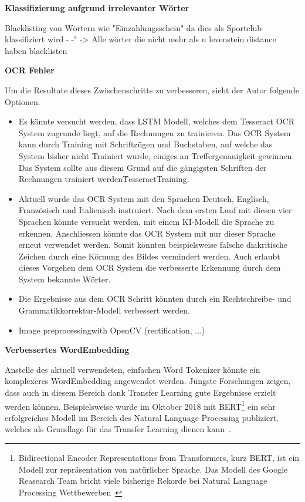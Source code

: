 \textbf{Klassifizierung aufgrund irrelevanter Wörter}

Blacklisting von Wörtern wie "Einzahlungsschein" da dies als Sportclub klassifiziert wird -.-" -> Alle wörter die nicht mehr als n levenstein distance haben blacklisten

\textbf{OCR Fehler}

Um die Resultate dieses Zwischenschritts zu verbesseren, sieht der Autor folgende Optionen.

\begin{itemize}
    \item Es könnte versucht werden, dass LSTM Modell, welches dem Tesseract OCR System zugrunde liegt, auf die Rechnungen zu trainieren. Das OCR System kann durch Training mit Schriftzügen und Buchstaben, auf welche das System bisher nicht Trainiert wurde, einiges an Treffergenauigkeit gewinnen. Das System sollte aus diesem Grund auf die gängigsten Schriften der Rechnungen trainiert werden\~{TesseractTraining}.
    \item Aktuell wurde das OCR System mit den Sprachen Deutsch, Englisch, Französisch und Italienisch instruiert. Nach dem ersten Lauf mit diesen vier Sprachen könnte versucht werden, mit einem KI-Modell die Sprache zu erkennen. Anschliessen könnte das OCR System mit nur dieser Sprache erneut verwendet werden. Somit könnten beispielsweise falsche diakritische Zeichen durch eine Körnung des Bildes vermindert werden. Auch erlaubt dieses Vorgehen dem OCR System die verbesserte Erkennung durch dem System bekannte Wörter.
    \item Die Ergebnisse aus dem OCR Schritt könnten durch ein Rechtschreibe- und Grammatikkorrektur-Modell verbessert werden. 
    \item Image preprocessingwith OpenCV (rectification, ...)
\end{itemize}

\textbf{Verbessertes WordEmbedding}

Anstelle des aktuell verwendeten, einfachen Word Tokenizer könnte ein komplexeres WordEmbedding angewendet werden. Jüngste Forschungen zeigen, dass auch in diesem Bereich dank Transfer Learning gute Ergebnisse erzielt werden können. Beispielsweise wurde im Oktober 2018 mit BERT\footnote{Bidirectional Encoder Representations from Transformers, kurz BERT, ist ein Modell zur repräsentation von natürlicher Sprache. Das Modell des Google Reasearch Team bricht viele bisherige Rekorde bei Natural Language Processing Wettbewerben~\autocite{Devlin2018}} ein sehr erfolgreiches Modell im Bereich des Natural Language Processing publiziert, welches als Grundlage für das Transfer Learning dienen kann~\autocite{Devlin2018}.

